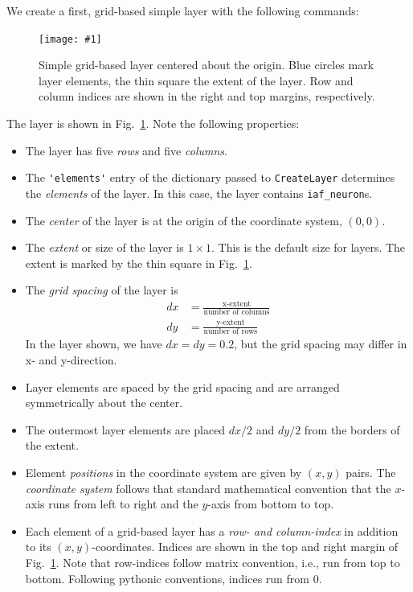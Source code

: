 \documentclass[a4paper,12pt]{report}
\newcommand{\scriptfig}[4]{%
\begin{figure}
\centerline{\texttt{[image: \#1]}}
\caption[#3]{#4}
\label{fig:#1}
\end{figure}%
}
\begin{document}
We create a first, grid-based simple layer 
with the following commands:
%

\scriptfig{layer1}{0.5}{Simple grid-based layer}%
{Simple grid-based layer centered about the origin. Blue circles mark
layer elements, the thin square the extent of the layer. Row and
column indices are shown in the right and top margins, respectively.}
%
The layer is shown in Fig.~\ref{fig:layer1}. Note the following
properties:
\begin{itemize}
\item The layer has five \emph{rows} and five
  \emph{columns}.
\item The \lstinline!'elements'! entry of the dictionary passed to
  \lstinline!CreateLayer! determines the
  \emph{elements} of the layer. In this case, the layer
  contains \lstinline!iaf_neuron!s.
\item The \emph{center} of the layer is at the origin of
  the coordinate system, $(0,0)$. 
\item The \emph{extent} or size of the layer is $1\times
  1$. This is the default size for layers. The extent is marked by the
  thin square in Fig.~\ref{fig:layer1}.
\item The \emph{grid spacing} of the layer is 
\begin{equation}\label{eq:dx_dy_extent}\begin{split}
dx &= \frac{\text{x-extent}}{\text{number of columns}} \\
dy &= \frac{\text{y-extent}}{\text{number of rows}} 
\end{split}\end{equation}
In the layer shown, we have $dx=dy=0.2$, but the grid spacing may differ
in x- and y-direction.
\item Layer elements are spaced by the grid spacing and are arranged
  symmetrically about the center. 
\item The outermost layer elements are placed $dx/2$ and $dy/2$ from
  the borders of the extent.
\item Element \emph{positions} in the coordinate
  system are given by $(x,y)$ pairs. The \emph{coordinate
    system} follows that standard
  mathematical convention that the $x$-axis runs from left to right
  and the $y$-axis from bottom to top.
\item Each element of a grid-based layer has a \emph{row- and
    column-index}  in addition to its
  $(x,y)$-coordinates. Indices are shown in the top and right margin
  of Fig.~\ref{fig:layer1}. Note that row-indices follow matrix
  convention, i.e., run from top to bottom. Following pythonic
  conventions, indices run from 0. 
\end{itemize}
\end{document}
